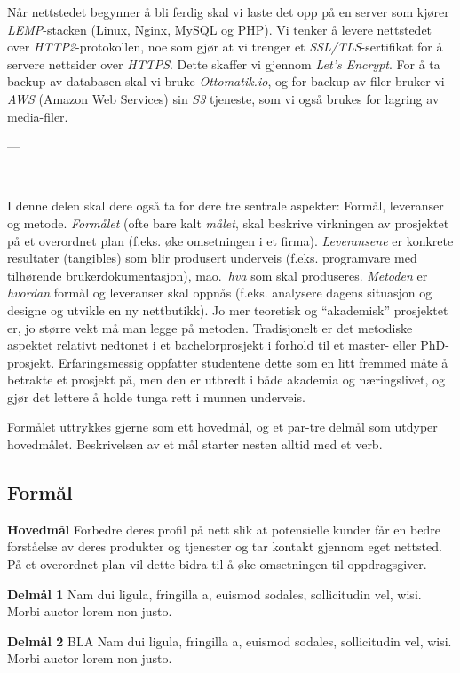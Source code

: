 \documentclass[11pt,a4paper]{report}
\begin{document}
Når nettstedet begynner å bli ferdig skal vi laste det opp på en server som kjører \textit{LEMP}-stacken (Linux, Nginx, MySQL og PHP). Vi tenker å levere nettstedet over \textit{HTTP2}-protokollen, noe som gjør at vi trenger et \textit{SSL/TLS}-sertifikat for å servere nettsider over \textit{HTTPS}. Dette skaffer vi gjennom \textit{Let's Encrypt}. For å ta backup av databasen skal vi bruke \textit{Ottomatik.io}, og for backup av filer bruker vi \textit{AWS} (Amazon Web Services) sin \textit{S3} tjeneste, som vi også brukes for lagring av media-filer.

---






---

I denne delen skal dere også ta for dere  tre sentrale aspekter: Formål, leveranser og metode. {\em Formålet} (ofte bare kalt {\em målet}, skal beskrive virkningen av prosjektet på et overordnet plan (f.eks. øke omsetningen i et firma). 
{\em Leveransene} er konkrete resultater (tangibles) som blir produsert underveis (f.eks. programvare med tilhørende brukerdokumentasjon), mao.\ {\em hva} som skal produseres. 
{\em Metoden} er {\em hvordan} formål og leveranser skal oppnås (f.eks. analysere dagens situasjon og designe og utvikle en ny nettbutikk). 
Jo mer teoretisk og ``akademisk'' prosjektet er, jo større vekt må man legge på metoden. Tradisjonelt er det metodiske aspektet relativt nedtonet i et bachelorprosjekt i forhold til et master- eller PhD-prosjekt.
Erfaringsmessig oppfatter studentene dette som en litt fremmed måte å betrakte et prosjekt på, men den er utbredt i både akademia og næringslivet, og gjør det lettere å holde tunga rett i munnen underveis. 

Formålet uttrykkes gjerne som ett hovedmål, og et par-tre delmål som utdyper hovedmålet. Beskrivelsen av et mål starter nesten alltid med et verb.


\subsection*{Formål}

\begin{compactitem}
\item [{\bf Hovedmål}] Forbedre deres profil på nett slik at potensielle kunder får en bedre forståelse av deres produkter og tjenester og tar kontakt gjennom eget nettsted. På et overordnet plan vil dette bidra til å øke omsetningen til oppdragsgiver.
\begin{compactitem}
\item [{\bf  Delmål 1} ] Nam dui ligula, fringilla a, euismod sodales, sollicitudin vel, wisi. Morbi
auctor lorem non justo.
\item [{\bf  Delmål 2} ] BLA Nam dui ligula, fringilla a, euismod sodales, sollicitudin vel, wisi. Morbi
auctor lorem non justo.
\end{compactitem}
\end{compactitem}
\end{document}
